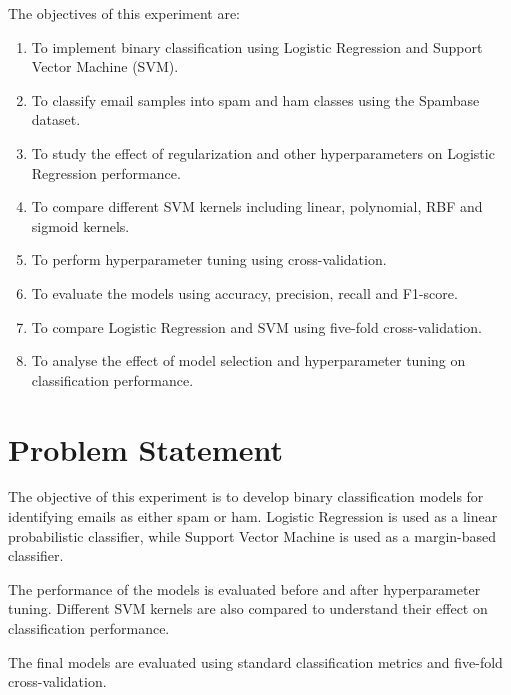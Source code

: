 \documentclass[12pt,a4paper]{article}
\begin{document}
The objectives of this experiment are:

\begin{enumerate}
    \item To implement binary classification using Logistic Regression
    and Support Vector Machine (SVM).
    
    \item To classify email samples into spam and ham classes using the
    Spambase dataset.
    
    \item To study the effect of regularization and other
    hyperparameters on Logistic Regression performance.
    
    \item To compare different SVM kernels including linear,
    polynomial, RBF and sigmoid kernels.
    
    \item To perform hyperparameter tuning using cross-validation.
    
    \item To evaluate the models using accuracy, precision, recall and
    F1-score.
    
    \item To compare Logistic Regression and SVM using five-fold
    cross-validation.
    
    \item To analyse the effect of model selection and hyperparameter
    tuning on classification performance.
\end{enumerate}


\section{Problem Statement}

The objective of this experiment is to develop binary classification
models for identifying emails as either spam or ham. Logistic Regression
is used as a linear probabilistic classifier, while Support Vector
Machine is used as a margin-based classifier.

The performance of the models is evaluated before and after
hyperparameter tuning. Different SVM kernels are also compared to
understand their effect on classification performance.

The final models are evaluated using standard classification metrics
and five-fold cross-validation.
\end{document}
